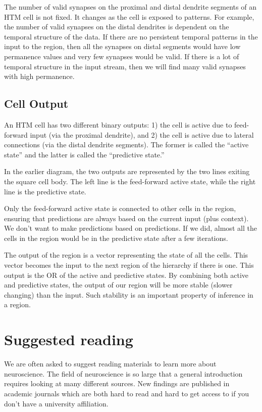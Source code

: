 \documentclass{report}
\begin{document}
The number of valid synapses on the proximal and distal dendrite
segments of an HTM cell is not fixed. It changes as the cell is
exposed to patterns. For example, the number of valid synapses on the
distal dendrites is dependent on the temporal structure of the
data. If there are no persistent temporal patterns in the input to the
region, then all the synapses on distal segments would have low
permanence values and very few synapses would be valid. If there is a
lot of temporal structure in the input stream, then we will find many
valid synapses with high permanence.

\subsection*{Cell Output}

An HTM cell has two different binary outputs: 1) the cell is active
due to feed- forward input (via the proximal dendrite), and 2) the
cell is active due to lateral connections (via the distal dendrite
segments). The former is called the ``active state'' and the latter is
called the ``predictive state.''

In the earlier diagram, the two outputs are represented by the two
lines exiting the square cell body. The left line is the feed-forward
active state, while the right line is the predictive state.

Only the feed-forward active state is connected to other cells in the
region, ensuring that predictions are always based on the current
input (plus context). We don't want to make predictions based on
predictions. If we did, almost all the cells in the region would be in
the predictive state after a few iterations.

The output of the region is a vector representing the state of all the
cells. This vector becomes the input to the next region of the
hierarchy if there is one. This output is the OR of the active and
predictive states. By combining both active and predictive states, the
output of our region will be more stable (slower changing) than the
input. Such stability is an important property of inference in a
region.

\section*{Suggested reading}

We are often asked to suggest reading materials to learn more about
neuroscience. The field of neuroscience is so large that a general
introduction requires looking at many different sources. New findings
are published in academic journals which are both hard to read and
hard to get access to if you don't have a university affiliation.
\end{document}
